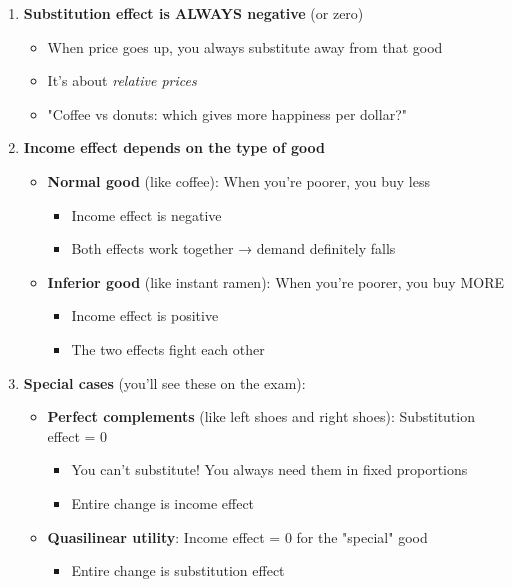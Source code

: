 \documentclass[12pt]{article}
\begin{document}
\begin{enumerate}[leftmargin=*]
\item \textbf{Substitution effect is ALWAYS negative} (or zero)
\begin{itemize}
\item When price goes up, you always substitute away from that good
\item It's about \textit{relative prices}
\item "Coffee vs donuts: which gives more happiness per dollar?"
\end{itemize}

\item \textbf{Income effect depends on the type of good}
\begin{itemize}
\item \textbf{Normal good} (like coffee): When you're poorer, you buy less
\begin{itemize}
\item Income effect is negative
\item Both effects work together → demand definitely falls
\end{itemize}
\item \textbf{Inferior good} (like instant ramen): When you're poorer, you buy MORE
\begin{itemize}
\item Income effect is positive
\item The two effects fight each other
\end{itemize}
\end{itemize}

\item \textbf{Special cases} (you'll see these on the exam):
\begin{itemize}
\item \textbf{Perfect complements} (like left shoes and right shoes): Substitution effect = 0
\begin{itemize}
\item You can't substitute! You always need them in fixed proportions
\item Entire change is income effect
\end{itemize}
\item \textbf{Quasilinear utility}: Income effect = 0 for the "special" good
\begin{itemize}
\item Entire change is substitution effect
\end{itemize}
\end{itemize}
\end{enumerate}
\end{document}
